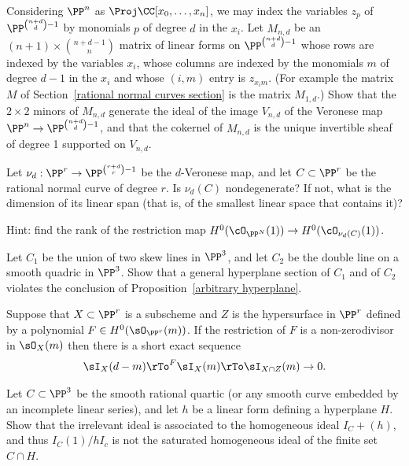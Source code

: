 \begin{exercise}\label{equations of Veroneses}
Considering $\PP^n$ as $\Proj \CC[x_0,\dots,x_n]$, we may index the variables $z_p$ of $\PP^{\binom{n+d}{d}-1}$ by  monomials $p$
of degree $d$ in the $x_i$. Let $M_{n,d}$ be an $(n+1)\times \binom{n+d-1}{n}$ matrix of linear forms
on $\PP^{\binom{n+d}{d}-1}$ whose rows are indexed by the variables $x_i$, whose columns are indexed by the monomials $m$ of degree $d-1$ in the $x_i$ and
whose $(i,m)$ entry is $z_{x_im}$. (For example the matrix
$M$ of Section~\ref{rational normal curves section} is the matrix $M_{1,d}$.) Show that the $2\times 2$ minors of $M_{n,d}$ generate the ideal of the image $V_{n,d}$ of the Veronese map 
$\PP^n\to \PP^{\binom{n+d}{d}-1}$, and that the cokernel of $M_{n,d}$ is the unique invertible sheaf of degree 1 supported on $V_{n,d}$.
\end{exercise}

\begin{exercise}
 Let $\nu_d: \PP^r \to \PP^{\binom{r+d}{r}-1}$ be the $d$-Veronese map, and let $C\subset \PP^r$ be the rational normal curve of degree $r$. Is $\nu_d(C)$ nondegenerate? If not, what is the dimension of its linear span (that is, of the smallest linear
 space that contains it)?
 
 Hint: find the rank of the restriction map $H^0(\cO_{\PP^N}(1)) \to H^0(\cO_{\nu_d(C)}(1))$.
\end{exercise}

\begin{exercise}\label{arbitrary hyperplane examples}
Let $C_1$ be the union of two skew lines in $\PP^3$, and let $C_2$ be the double line on a smooth quadric in $\PP^3$.
Show that a general hyperplane section of $C_1$ and of $C_2$  violates the conclusion of Proposition~\ref{arbitrary hyperplane}.
\end{exercise}

\begin{exercise}\label{restriction of ideals}
Suppose that $X\subset \PP^r$ is a subscheme and  $Z$ is the hypersurface in $\PP^r$ defined by a polynomial $F\in H^0(\sO_{\PP^r}(m))$. If the restriction of $F$ is a non-zerodivisor in 
$\sO_X(m)$  then there is a short exact sequence
$$
\sI_X(d-m) \rTo^F \sI_X(m) \rTo \sI_{X\cap Z}(m) \to 0.
$$
\end{exercise}

\begin{exercise}\label{bad restriction}
Let $C\subset \PP^3$ be the smooth rational quartic (or any smooth curve embedded by an incomplete linear series), and let $h$ be a linear form defining a hyperplane $H$.
Show that
the  irrelevant ideal is associated to the 
homogeneous ideal $I_C+(h)$, and thus $I_C(1)/hI_c$ is not the saturated homogeneous ideal of the finite
set $C\cap H$. 
\end{exercise}

